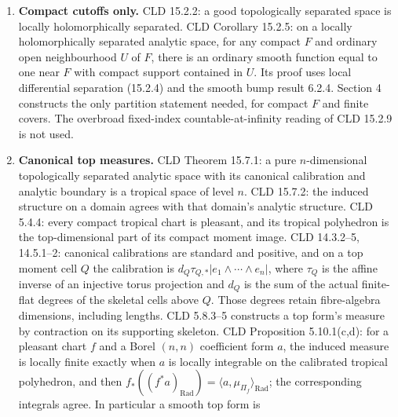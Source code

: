 \documentclass[11pt]{article}
\begin{document}
\begin{enumerate}
  ordinary sheaf stable under wedge, \(J,d',d''\). Moment pullback
  commutes with the exterior calculus (CLD 3.3.12). In a moment a
  logarithm is an affine coordinate, so \(Dt_f=0\) as a \textbf{form}.
  CLD 3.4.4: for a G-tropical chart \(f\) and a coefficient form \(a\),
  its pullback is zero in the G-form sheaf exactly when \(a\) restricts
  to zero on \(f(V)\) for every compact domain \(V\). This identifies
  the ordinary form sheaves when the analytic units, domains and moment
  images are the same; it is not descent through scalar projection.
\item
  \textbf{Compact cutoffs only.} CLD 15.2.2: a good topologically
  separated space is locally holomorphically separated. CLD Corollary
  15.2.5: on a locally holomorphically separated analytic space, for any
  compact \(F\) and ordinary open neighbourhood \(U\) of \(F\), there is
  an ordinary smooth function equal to one near \(F\) with compact
  support contained in \(U\). Its proof uses local differential
  separation (15.2.4) and the smooth bump result 6.2.4. Section 4
  constructs the only partition statement needed, for compact \(F\) and
  finite covers. The overbroad fixed-index countable-at-infinity reading
  of CLD 15.2.9 is not used.
\item
  \textbf{Canonical top measures.} CLD Theorem 15.7.1: a pure
  \(n\)-dimensional topologically separated analytic space with its
  canonical calibration and analytic boundary is a tropical space of
  level \(n\). CLD 15.7.2: the induced structure on a domain agrees with
  that domain's analytic structure. CLD 5.4.4: every compact tropical
  chart is pleasant, and its tropical polyhedron is the top-dimensional
  part of its compact moment image. CLD 14.3.2--5, 14.5.1--2: canonical
  calibrations are standard and positive, and on a top moment cell \(Q\)
  the calibration is \(d_Q\tau_{Q,*}|e_1\wedge\cdots\wedge e_n|\), where
  \(\tau_Q\) is the affine inverse of an injective torus projection and
  \(d_Q\) is the sum of the actual finite-flat degrees of the skeletal
  cells above \(Q\). Those degrees retain fibre-algebra dimensions,
  including lengths. CLD 5.8.3--5 constructs a top form's measure by
  contraction on its supporting skeleton. CLD Proposition 5.10.1(c,d):
  for a pleasant chart \(f\) and a Borel \((n,n)\) coefficient form
  \(a\), the induced measure is locally finite exactly when \(a\) is
  locally integrable on the calibrated tropical polyhedron, and then
  \(f_*((f^*a)_{\mathrm{Rad}})=\langle a,\mu_{\Pi_f}\rangle_{\mathrm{Rad}}\);
  the corresponding integrals agree. In particular a smooth top form is

\end{enumerate}
\end{document}

